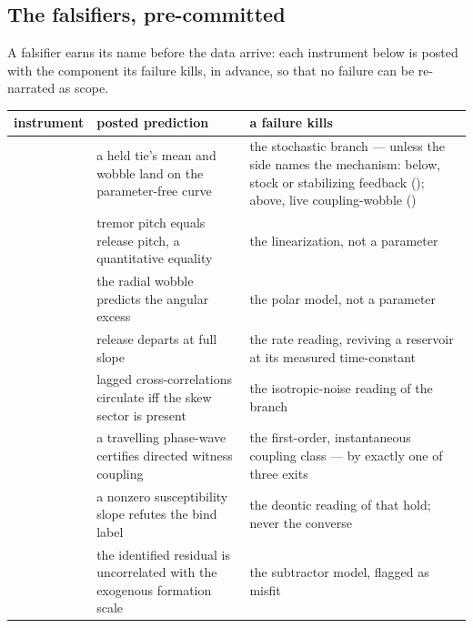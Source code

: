 \documentclass[../main]{subfiles}
\begin{document}
\subsection{The falsifiers, pre-committed}
\label{subsec:osc:precommit}
%
A falsifier earns its name before the data arrive: each instrument below is posted with
the component its failure kills, in advance, so that no failure can be re-narrated as
scope.

\begin{table}[htbp]
  \centering
  \begin{tabularx}{\textwidth}{@{} l >{\hsize}L >{\hsize}L @{}}
    \toprule
    \textbf{instrument} & \textbf{posted prediction} & \textbf{a failure kills} \\
    \midrule
     & a held tie's mean and wobble land on the
      parameter-free curve & the stochastic branch --- unless the side names the
      mechanism: below, stock or stabilizing feedback (); above,
      live coupling-wobble () \\
    \addlinespace
     & tremor pitch equals release pitch, a quantitative
      equality & the linearization, not a parameter \\
    \addlinespace
     & the radial wobble predicts the angular excess
      & the polar model, not a parameter \\
    \addlinespace
     & release departs at full slope & the rate reading, reviving
      a reservoir at its measured time-constant \\
    \addlinespace
     & lagged cross-correlations circulate iff the skew sector is
      present & the isotropic-noise reading of the branch \\
    \addlinespace
     & a travelling phase-wave certifies directed witness coupling
      & the first-order, instantaneous coupling class --- by exactly one of three
      exits \\
    \addlinespace
     & a nonzero susceptibility slope refutes the bind label
      & the deontic reading of that hold; never the converse \\
    \addlinespace
     & the identified residual is uncorrelated with the
      exogenous formation scale & the subtractor model, flagged as misfit \\
    \bottomrule
  \end{tabularx}
\end{table}
\end{document}
